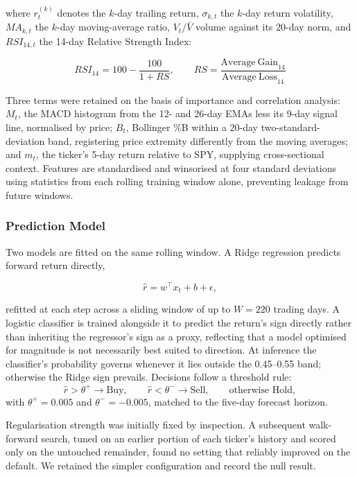 \documentclass[conference]{IEEEtran}
\begin{document}
where $r_t^{(k)}$ denotes the $k$-day trailing return, $\sigma_{k,t}$ the $k$-day return volatility, $MA_{k,t}$ the $k$-day moving-average ratio, $V_t/\bar V$ volume against its 20-day norm, and $RSI_{14,t}$ the 14-day Relative Strength Index:

\begin{equation}
RSI_{14} = 100 - \frac{100}{1 + RS}, \qquad RS = \frac{\mathrm{Average\ Gain}_{14}}{\mathrm{Average\ Loss}_{14}}
\end{equation}

Three terms were retained on the basis of importance and correlation analysis: $M_t$, the MACD histogram from the 12- and 26-day EMAs less its 9-day signal line, normalised by price; $B_t$, Bollinger \%B within a 20-day two-standard-deviation band, registering price extremity differently from the moving averages; and $m_t$, the ticker's 5-day return relative to SPY, supplying cross-sectional context. Features are standardised and winsorised at four standard deviations using statistics from each rolling training window alone, preventing leakage from future windows.

\subsubsection{Prediction Model}

Two models are fitted on the same rolling window. A Ridge regression predicts forward return directly,

\begin{equation}
\hat{r} = w^\top x_t + b + \epsilon,
\end{equation}

refitted at each step across a sliding window of up to $W = 220$ trading days. A logistic classifier is trained alongside it to predict the return's sign directly rather than inheriting the regressor's sign as a proxy, reflecting that a model optimised for magnitude is not necessarily best suited to direction. At inference the classifier's probability governs whenever it lies outside the 0.45--0.55 band; otherwise the Ridge sign prevails. Decisions follow a threshold rule:
\[
\hat{r} > \theta^{+} \rightarrow \text{Buy}, \qquad
\hat{r} < \theta^{-} \rightarrow \text{Sell}, \qquad
\text{otherwise Hold},
\]
with $\theta^{+} = 0.005$ and $\theta^{-} = -0.005$, matched to the five-day forecast horizon.

Regularisation strength was initially fixed by inspection. A subsequent walk-forward search, tuned on an earlier portion of each ticker's history and scored only on the untouched remainder, found no setting that reliably improved on the default. We retained the simpler configuration and record the null result.
\end{document}

